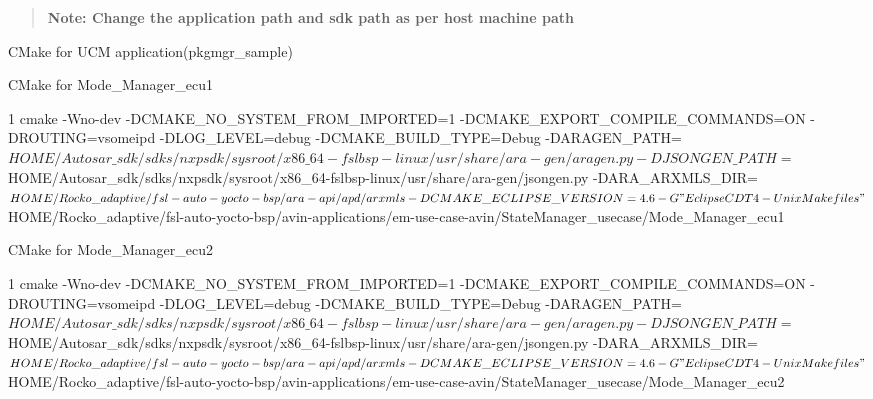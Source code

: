 \begin{quote}
{\bfseries Note\+: Change the application path and sdk path as per host machine path} \end{quote}



\begin{DoxyItemize}
\item C\+Make for U\+CM application(pkgmgr\+\_\+sample) 

\item C\+Make for Mode\+\_\+\+Manager\+\_\+ecu1 
\begin{DoxyCode}
1 cmake  -Wno-dev -DCMAKE\_NO\_SYSTEM\_FROM\_IMPORTED=1  -DCMAKE\_EXPORT\_COMPILE\_COMMANDS=ON  -DROUTING=vsomeipd 
       -DLOG\_LEVEL=debug -DCMAKE\_BUILD\_TYPE=Debug
       -DARAGEN\_PATH=$HOME/Autosar\_sdk/sdks/nxpsdk/sysroot/x86\_64-fslbsp-linux/usr/share/ara-gen/aragen.py 
       -DJSONGEN\_PATH=$HOME/Autosar\_sdk/sdks/nxpsdk/sysroot/x86\_64-fslbsp-linux/usr/share/ara-gen/jsongen.py  -DARA\_ARXMLS\_DIR=$HOME/Rocko\_adaptive/fsl-auto-yocto-bsp/ara-api/apd/arxmls
       -DCMAKE\_ECLIPSE\_VERSION=4.6 -G"Eclipse CDT4 - Unix Makefiles" 
       $HOME/Rocko\_adaptive/fsl-auto-yocto-bsp/avin-applications/em-use-case-avin/StateManager\_usecase/Mode\_Manager\_ecu1
\end{DoxyCode}

\item C\+Make for Mode\+\_\+\+Manager\+\_\+ecu2 
\begin{DoxyCode}
1 cmake  -Wno-dev -DCMAKE\_NO\_SYSTEM\_FROM\_IMPORTED=1  -DCMAKE\_EXPORT\_COMPILE\_COMMANDS=ON  -DROUTING=vsomeipd 
       -DLOG\_LEVEL=debug -DCMAKE\_BUILD\_TYPE=Debug
       -DARAGEN\_PATH=$HOME/Autosar\_sdk/sdks/nxpsdk/sysroot/x86\_64-fslbsp-linux/usr/share/ara-gen/aragen.py 
       -DJSONGEN\_PATH=$HOME/Autosar\_sdk/sdks/nxpsdk/sysroot/x86\_64-fslbsp-linux/usr/share/ara-gen/jsongen.py  -DARA\_ARXMLS\_DIR=$HOME/Rocko\_adaptive/fsl-auto-yocto-bsp/ara-api/apd/arxmls
       -DCMAKE\_ECLIPSE\_VERSION=4.6 -G"Eclipse CDT4 - Unix Makefiles" 
       $HOME/Rocko\_adaptive/fsl-auto-yocto-bsp/avin-applications/em-use-case-avin/StateManager\_usecase/Mode\_Manager\_ecu2
\end{DoxyCode}


\end{DoxyItemize}
